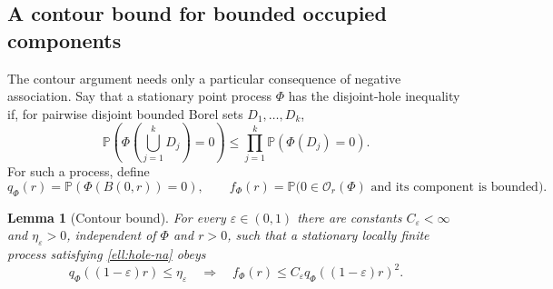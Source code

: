 \documentclass[11pt,a4paper]{article}
\newtheorem{lemma}[theorem]{Lemma}
\theoremstyle{definition}
\theoremstyle{remark}
\numberwithin{equation}{section}
\begin{document}
\subsection{A contour bound for bounded occupied components}

The contour argument needs only a particular consequence of negative
association.  Say that a stationary point process $\Phi$ has the
disjoint-hole inequality if, for pairwise disjoint bounded Borel sets
$D_1,\ldots,D_k$,
\begin{equation}\label{ell:hole-na}
 \mathbb P\left(\Phi\left(\bigcup_{j=1}^kD_j\right)=0\right)
 \le\prod_{j=1}^k\mathbb P(\Phi(D_j)=0).
\end{equation}
For such a process, define
\[
 q_\Phi(r)=\mathbb P(\Phi(B(0,r))=0),\qquad
 f_\Phi(r)=\mathbb P\bigl(0\in\mathcal O_r(\Phi)
       \text{ and its component is bounded}\bigr).
\]

\begin{lemma}[Contour bound]\label{ell:contour}
For every $\varepsilon\in(0,1)$ there are constants
$C_\varepsilon<\infty$ and $\eta_\varepsilon>0$, independent of
$\Phi$ and $r>0$, such that a stationary locally finite process
satisfying \eqref{ell:hole-na} obeys
\begin{equation}\label{ell:contour-bound}
 q_\Phi((1-\varepsilon)r)\le\eta_\varepsilon
 \quad\Longrightarrow\quad
 f_\Phi(r)\le C_\varepsilon
                  q_\Phi((1-\varepsilon)r)^2.
\end{equation}
\end{lemma}
\end{document}

